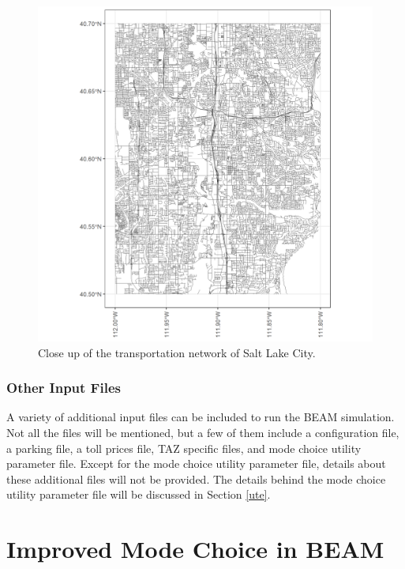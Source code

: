 \documentclass[12pt, oneside, openright]{byuthesis}
\begin{document}
\begin{figure}

{\centering \includegraphics[width=29.17in]{pics/smallnetwork} 

}

\caption{Close up of the transportation network of Salt Lake City.}\label{fig:closent}
\end{figure}

\hypertarget{other-input-files}{%
\subsubsection{Other Input Files}\label{other-input-files}}

A variety of additional input files can be included to run the BEAM simulation. Not all the files will be mentioned, but a few of them include a configuration file, a parking file, a toll prices file, TAZ specific files, and mode choice utility parameter file. Except for the mode choice utility parameter file, details about these additional files will not be provided. The details behind the mode choice utility parameter file will be discussed in Section \ref{ute}.

\hypertarget{mbeam}{%
\section{Improved Mode Choice in BEAM}\label{mbeam}}
\end{document}
